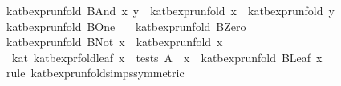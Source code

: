 \begin{isabellebody}
{}\ {}kat{}bexpr{}unfold\ {}BAnd\ x\ y{}\ {}\ kat{}bexpr{}unfold\ x\ {}\ kat{}bexpr{}unfold\ y{}\isanewline
{}\ {}kat{}bexpr{}unfold\ BOne\ {}\ {}{}\isanewline
{}\ {}kat{}bexpr{}unfold\ BZero\ {}\ {}{}\isanewline
{}\ {}kat{}bexpr{}unfold\ {}BNot\ x{}\ {}\ {}{}kat{}bexpr{}unfold\ x{}{}\isanewline
\isanewline
{}\isamarkupfalse%
\ {}\ kat{}\ kat{}bexpr{}fold{}leaf{}\ {}x\ {}\ tests\ A\ {}\ x\ {}\ kat{}bexpr{}unfold\ {}BLeaf\ x{}{}\isanewline
%
\isadelimproof
\ \ %
\endisadelimproof
%
\isatagproof
{}\isamarkupfalse%
\ {}rule\ kat{}bexpr{}unfold{}simps{}{}{}{}symmetric{}{}%

\end{isabellebody}
